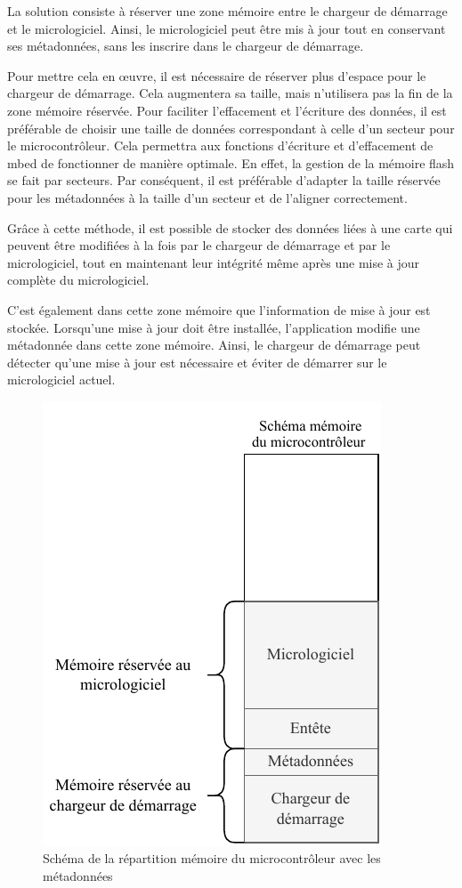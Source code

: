La solution consiste à réserver une zone mémoire entre le chargeur de démarrage et le micrologiciel.
Ainsi, le micrologiciel peut être mis à jour tout en conservant ses métadonnées, sans les inscrire dans le chargeur de démarrage.

Pour mettre cela en \oe{}uvre, il est nécessaire de réserver plus d'espace pour le chargeur de démarrage.
Cela augmentera sa taille, mais n'utilisera pas la fin de la zone mémoire réservée. Pour faciliter l'effacement et l'écriture des données, il est préférable de choisir une taille de données correspondant à celle d'un secteur pour le microcontrôleur.
Cela permettra aux fonctions d'écriture et d'effacement de mbed de fonctionner de manière optimale.
En effet, la gestion de la mémoire flash se fait par secteurs.
Par conséquent, il est préférable d'adapter la taille réservée pour les métadonnées à la taille d'un secteur et de l'aligner correctement.

Grâce à cette méthode, il est possible de stocker des données liées à une carte qui peuvent être modifiées à la fois par le chargeur de démarrage et par le micrologiciel, tout en maintenant leur intégrité même après une mise à jour complète du micrologiciel.

C'est également dans cette zone mémoire que l'information de mise à jour est stockée.
Lorsqu'une mise à jour doit être installée, l'application modifie une métadonnée dans cette zone mémoire.
Ainsi, le chargeur de démarrage peut détecter qu'une mise à jour est nécessaire et éviter de démarrer sur le micrologiciel actuel.

\begin{figure}[H]
    \centering
    \includegraphics[scale=1.3]{./assets/figures/metadata.pdf}
    \caption{Schéma de la répartition mémoire du microcontrôleur avec les métadonnées}
\end{figure}

